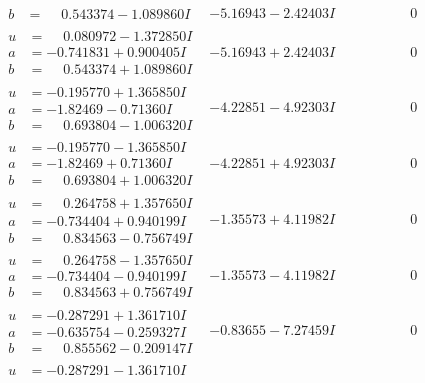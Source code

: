 \documentclass[1p]{elsarticle_modified}
\theoremstyle{definition}
\begin{document}
$$\begin{array}{c|c|c}
\begin{aligned}
b &= \phantom{-}0.543374 - 1.089860 I\end{aligned}
 & -5.16943 - 2.42403 I & \phantom{-0.000000 } 0 \\ \hline\begin{aligned}
u &= \phantom{-}0.080972 - 1.372850 I \\
a &= -0.741831 + 0.900405 I \\
b &= \phantom{-}0.543374 + 1.089860 I\end{aligned}
 & -5.16943 + 2.42403 I & \phantom{-0.000000 } 0 \\ \hline\begin{aligned}
u &= -0.195770 + 1.365850 I \\
a &= -1.82469 - 0.71360 I \\
b &= \phantom{-}0.693804 - 1.006320 I\end{aligned}
 & -4.22851 - 4.92303 I & \phantom{-0.000000 } 0 \\ \hline\begin{aligned}
u &= -0.195770 - 1.365850 I \\
a &= -1.82469 + 0.71360 I \\
b &= \phantom{-}0.693804 + 1.006320 I\end{aligned}
 & -4.22851 + 4.92303 I & \phantom{-0.000000 } 0 \\ \hline\begin{aligned}
u &= \phantom{-}0.264758 + 1.357650 I \\
a &= -0.734404 + 0.940199 I \\
b &= \phantom{-}0.834563 - 0.756749 I\end{aligned}
 & -1.35573 + 4.11982 I & \phantom{-0.000000 } 0 \\ \hline\begin{aligned}
u &= \phantom{-}0.264758 - 1.357650 I \\
a &= -0.734404 - 0.940199 I \\
b &= \phantom{-}0.834563 + 0.756749 I\end{aligned}
 & -1.35573 - 4.11982 I & \phantom{-0.000000 } 0 \\ \hline\begin{aligned}
u &= -0.287291 + 1.361710 I \\
a &= -0.635754 - 0.259327 I \\
b &= \phantom{-}0.855562 - 0.209147 I\end{aligned}
 & -0.83655 - 7.27459 I & \phantom{-0.000000 } 0 \\ \hline\begin{aligned}
u &= -0.287291 - 1.361710 I \\

\end{aligned}
\end{array}$$
\end{document}
